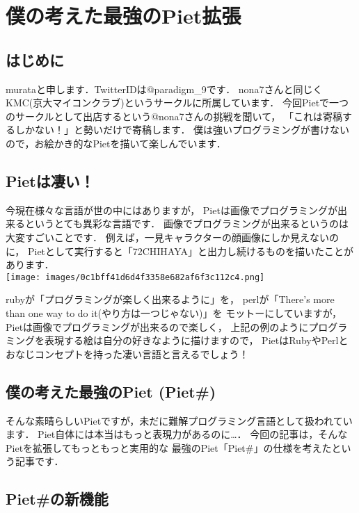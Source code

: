 \chapter{僕の考えた最強のPiet拡張}

\section{はじめに}

murataと申します．TwitterIDは@paradigm\_9です．
nona7さんと同じくKMC(京大マイコンクラブ)というサークルに所属しています．
今回Pietで一つのサークルとして出店するという@nona7さんの挑戦を聞いて，
「これは寄稿するしかない！」と勢いだけで寄稿します．
僕は強いプログラミングが書けないので，お絵かき的なPietを描いて楽しんでいます．

\section{Pietは凄い！}

今現在様々な言語が世の中にはありますが，
Pietは画像でプログラミングが出来るというとても異彩な言語です．
画像でプログラミングが出来るというのは大変すごいことです．
例えば，一見キャラクターの顔画像にしか見えないのに，
Pietとして実行すると「72CHIHAYA」と出力し続けるものを描いたことがあります．\\\texttt{[image: images/0c1bff41d6d4f3358e682af6f3c112c4.png]}

rubyが「プログラミングが楽しく出来るように」を， perlが「There's more
than one way to do it(やり方は一つじゃない)」を モットーにしていますが，
Pietは画像でプログラミングが出来るので楽しく，
上記の例のようにプログラミングを表現する絵は自分の好きなように描けますので，
PietはRubyやPerlとおなじコンセプトを持った凄い言語と言えるでしょう！

\section{僕の考えた最強のPiet (Piet\#)}

そんな素晴らしいPietですが，未だに難解プログラミング言語として扱われています．
Piet自体には本当はもっと表現力があるのに\ldots{}．
今回の記事は，そんなPietを拡張してもっともっと実用的な
最強のPiet「Piet\#」の仕様を考えたという記事です．

\section{Piet\#の新機能}

